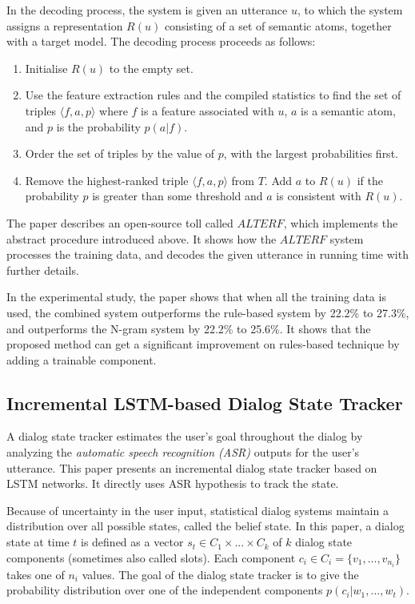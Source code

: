 \documentclass[paper=a4, fontsize=18pt]{article} %
\numberwithin{equation}{section} %
\numberwithin{figure}{section} %
\numberwithin{table}{section} %
\begin{document}
In the decoding process, the system is given an utterance $u$, to which the system assigns a representation $R(u)$ consisting of a set of semantic atoms, together with a target model. The decoding process  proceeds as follows:
\begin{enumerate}
\item Initialise $R(u)$ to the empty set.
\item Use the feature extraction rules and the compiled statistics to find the set of triples $\langle f, a, p \rangle$ where $f$ is a feature associated with $u$, $a$ is a semantic atom, and $p$ is the probability $p(a | f)$.
\item Order the set of triples by the value of $p$, with the largest probabilities first.
\item Remove the highest-ranked triple $\langle f,a,p \rangle$ from $T$. Add $a$ to $R(u)$ if the probability $p$ is greater than some threshold and $a$ is consistent with $R(u)$.
\end{enumerate}

The paper describes an open-source toll called $ALTERF$, which implements the abstract procedure introduced above. It shows how the $ALTERF$ system processes the training data, and decodes the given utterance in running time with further details.

In the experimental study, the paper shows that when all the training data is used, the combined system outperforms the rule-based system by 22.2\% to 27.3\%, and outperforms the N-gram system by 22.2\% to 25.6\%. It shows that the proposed method can get a significant improvement on rules-based technique by adding a trainable component.

\subsection{Incremental LSTM-based Dialog State Tracker \cite{Zilka2015}}

A dialog state tracker estimates the user's goal throughout the dialog by analyzing the \emph{automatic speech recognition (ASR)} outputs for the user's utterance. This paper presents an incremental dialog state tracker based on LSTM networks. It directly uses ASR hypothesis to track the state.

Because of uncertainty in the user input, statistical dialog systems maintain a distribution over all possible states, called the belief state. In this paper, a dialog state at time $t$ is defined as a vector $s_t \in C_1 \times ... \times C_k$ of $k$ dialog state components (sometimes also called slots). Each component $c_i \in C_i = \{ v_1, ..., v_{n_i} \}$ takes one of $n_i$ values. The goal of the dialog state tracker is to give the probability distribution over one of the independent components $p(c_i | w_1, ..., w_t)$.
\end{document}
